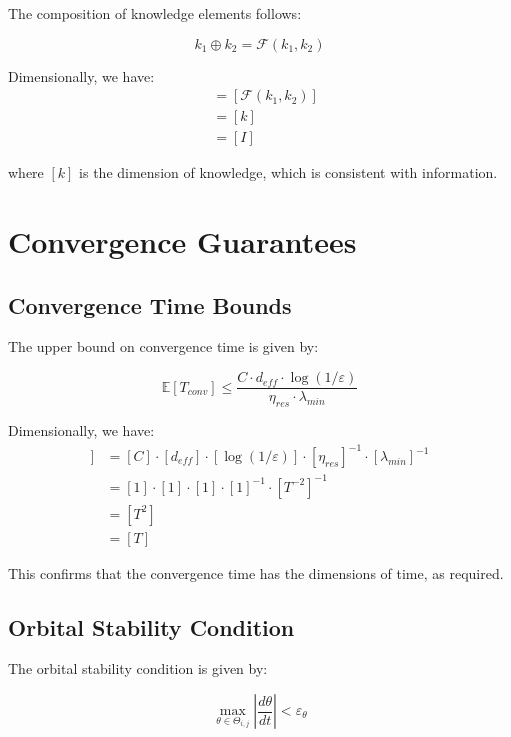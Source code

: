 The composition of knowledge elements follows:

\begin{equation}
k_1 \oplus k_2 = \mathcal{F}(k_1, k_2)
\end{equation}

Dimensionally, we have:
\begin{align}
[k_1 \oplus k_2] &= [\mathcal{F}(k_1, k_2)] \\
&= [k] \\
&= [I]
\end{align}

where $[k]$ is the dimension of knowledge, which is consistent with information.

\section{Convergence Guarantees}

\subsection{Convergence Time Bounds}

The upper bound on convergence time is given by:

\begin{equation}
\mathbb{E}[T_{conv}] \leq \frac{C \cdot d_{eff} \cdot \log(1/\varepsilon)}{\eta_{res} \cdot \lambda_{min}}
\end{equation}

Dimensionally, we have:
\begin{align}
[\mathbb{E}[T_{conv}]] &= [C] \cdot [d_{eff}] \cdot [\log(1/\varepsilon)] \cdot [\eta_{res}]^{-1} \cdot [\lambda_{min}]^{-1} \\
&= [1] \cdot [1] \cdot [1] \cdot [1]^{-1} \cdot [T^{-2}]^{-1} \\
&= [T^2] \\
&= [T]
\end{align}

This confirms that the convergence time has the dimensions of time, as required.

\subsection{Orbital Stability Condition}

The orbital stability condition is given by:

\begin{equation}
\max_{\theta \in \Theta_{i,j}} \left| \frac{d\theta}{dt} \right| < \varepsilon_{\theta}
\end{equation}

